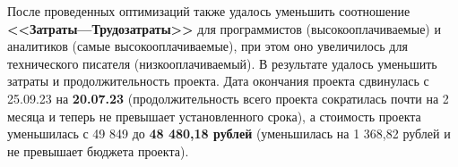 После проведенных оптимизаций также удалось уменьшить соотношение \textbf{<<Затраты---Трудозатраты>>} для программистов (высокооплачиваемые) и аналитиков (самые высокооплачиваемые), при этом оно увеличилось для технического писателя (низкооплачиваемый). В результате удалось уменьшить затраты и продолжительность проекта.
Дата окончания проекта сдвинулась с 25.09.23 на \textbf{20.07.23} (продолжительность всего проекта сократилась почти на 2 месяца и теперь не превышает установленного срока), а стоимость проекта уменьшилась с 49 849 до \textbf{48 480,18 рублей} (уменьшилась на 1 368,82 рублей и не превышает бюджета проекта).

